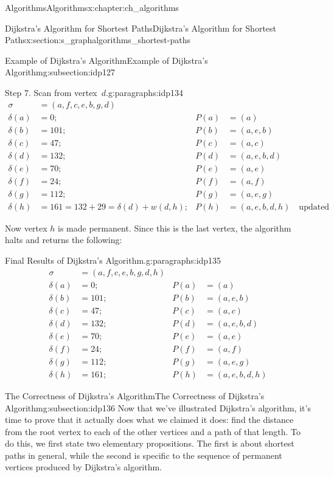 \documentclass[oneside,10pt,]{book}
\numberwithin{equation}{section}
\newcommand{\amp}{&}
\begin{document}
\begin{chapterptx}{Algorithms}{}{Algorithms}{}{}{x:chapter:ch_algorithms}
\begin{sectionptx}{Dijkstra's Algorithm for Shortest Paths}{}{Dijkstra's Algorithm for Shortest Paths}{}{}{x:section:s_graphalgorithms_shortest-paths}
\begin{subsectionptx}{Example of Dijkstra's Algorithm}{}{Example of Dijkstra's Algorithm}{}{}{g:subsection:idp127}
\begin{paragraphs}{Step 7.  Scan from vertex~\(d\).}{g:paragraphs:idp134}
\begin{align*}
\sigma\amp=(a,f,c,e,b,g,d)\\
\delta(a)\amp=0; \amp P(a)\amp=(a)\\
\delta(b)\amp=101; \amp P(b)\amp=(a,e,b)\\
\delta(c)\amp=47; \amp P(c)\amp=(a,c)\\
\delta(d)\amp= 132; \amp P(d)\amp=(a,e,b,d)\\
\delta(e)\amp=70; \amp P(e)\amp=(a,e)\\
\delta(f)\amp=24; \amp P(f)\amp=(a,f)\\
\delta(g)\amp=112; \amp P(g)\amp=(a,e,g)\\
\delta(h)\amp=161 = 132+29=\delta(d)+w(d,h); \amp P(h)\amp=(a,e,b,d,h)\quad\text{updated}
\end{align*}
%
\par
Now vertex \(h\) is made permanent. Since this is the last vertex, the algorithm halts and returns the following:%
\end{paragraphs}%
\begin{paragraphs}{Final Results of Dijkstra's Algorithm.}{g:paragraphs:idp135}%
%
\begin{align*}
\sigma\amp=(a,f,c,e,b,g,d,h)\\
\delta(a)\amp=0; \amp P(a)\amp=(a)\\
\delta(b)\amp=101; \amp P(b)\amp=(a,e,b)\\
\delta(c)\amp=47; \amp P(c)\amp=(a,c)\\
\delta(d)\amp= 132; \amp P(d)\amp=(a,e,b,d)\\
\delta(e)\amp=70; \amp P(e)\amp=(a,e)\\
\delta(f)\amp=24; \amp P(f)\amp=(a,f)\\
\delta(g)\amp=112; \amp P(g)\amp=(a,e,g)\\
\delta(h)\amp=161; \amp P(h)\amp=(a,e,b,d,h)
\end{align*}
%
\end{paragraphs}%
\end{subsectionptx}
%
%
\typeout{************************************************}
\typeout{************************************************}
%
\begin{subsectionptx}{The Correctness of Dijkstra's Algorithm}{}{The Correctness of Dijkstra's Algorithm}{}{}{g:subsection:idp136}
Now that we've illustrated Dijkstra's algorithm, it's time to prove that it actually does what we claimed it does: find the distance from the root vertex to each of the other vertices and a path of that length. To do this, we first state two elementary propositions. The first is about shortest paths in general, while the second is specific to the sequence of permanent vertices produced by Dijkstra's algorithm.%

\end{subsectionptx}
\end{sectionptx}
\end{chapterptx}
\end{document}
